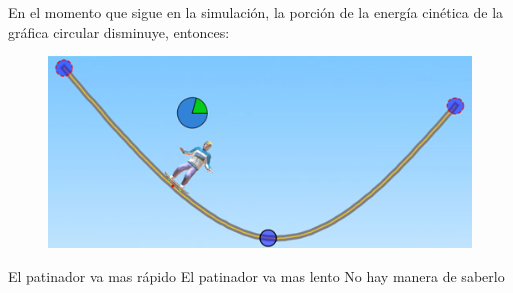 En el momento que sigue en la simulación, la porción de la energía cinética de la gráfica circular disminuye, entonces:

\begin{minipage}{0.3\textwidth}
    \begin{figure}[H]
        \includegraphics[width=\linewidth]{../images/q028c}
    \end{figure}
\end{minipage}\hfill
\begin{minipage}{0.6\textwidth}
    \begin{choices}
        \choice El patinador va mas rápido
        \choice El patinador va mas lento
        \choice No hay manera de saberlo
    \end{choices}
\end{minipage}

